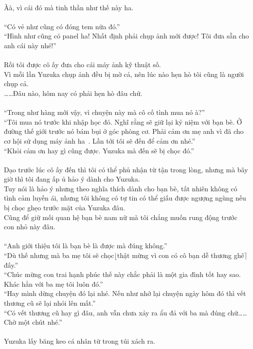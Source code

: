 \documentclass[12pt,a4paper, twosides]{book}
\begin{document}
\\
Àà, vì cái đó mà tinh thần như thế này ha.\\
\\
“Có vẻ như cũng có đóng tem nữa đó.”\\
“Hình như cũng có panel ha! Nhất định phải chụp ảnh mới được! Tôi đưa sẵn cho anh cái này nhé!”\\
\\
Rồi tôi được cô ấy đưa cho cái máy ảnh kỹ thuật số.\\
Vì mỗi lần Yuzuka chụp ảnh đều bị mờ cả, nên lúc nào hẹn hò tôi cũng là người chụp cả.\\
……Đâu nào, hôm nay có phải hẹn hò đâu chứ.\\
\\
“Trong như hàng mới vậy, vì chuyện này mà cô cố tình mua nó à?”\\
“Tôi mua nó trước khi nhập học đó. Nghĩ rằng sẽ giữ lại kỷ niệm với bạn bè. Ở đường thế giới trước nó bám bụi ở góc phòng cơ. Phải cảm ơn mẹ anh vì đã cho cơ hội sử dụng máy ảnh ha~. Lần tới tôi sẽ đến để cảm ơn nhé.”\\
“Khỏi cảm ơn hay gì cũng được. Yuzuka mà đến sẽ bị chọc đó.”\\
\\
Dạo trước lúc cô ấy đến thì tôi có thể phủ nhận từ tận trong lòng, nhưng mà bây giờ thì tôi đang ấp ủ hảo ý dành cho Yuzuka.\\
Tuy nói là hảo ý nhưng theo nghĩa thích dành cho bạn bè, tất nhiên không có tình cảm luyến ái, nhưng tôi không có tự tin có thể giấu được ngượng ngùng nếu bị chọc ghẹo trước mặt của Yuzuka đâu.\\
Cũng để giữ mối quan hệ bạn bè nam nữ mà tôi chẳng muốn rung động trước con nhỏ này đâu.\\
\\
“Anh giới thiệu tôi là bạn bè là được mà đúng không.”\\
“Dù thế nhưng mà ba mẹ tôi sẽ chọc$\lfloor$thật mừng vì con có cô bạn dễ thương ghê$\rceil$đấy.”\\
“Chúc mừng con trai hạnh phúc thế này chắc phải là một gia đình tốt hay sao. Khác hẳn với ba mẹ tôi luôn đó.”\\
“Hay mình dừng chuyện đó lại nhé. Nếu như nhớ lại chuyện ngày hôm đó thì vết thương cũ sẽ lại nhói lên mất.”\\
“Có vết thương cũ hay gì đâu, anh vẫn chưa xảy ra ẩu đả với ba mà đúng chứ……Chờ một chút nhé.”\\
\\
Yuzuka lấy băng keo cá nhân từ trong túi xách ra.\\
\end{document}
